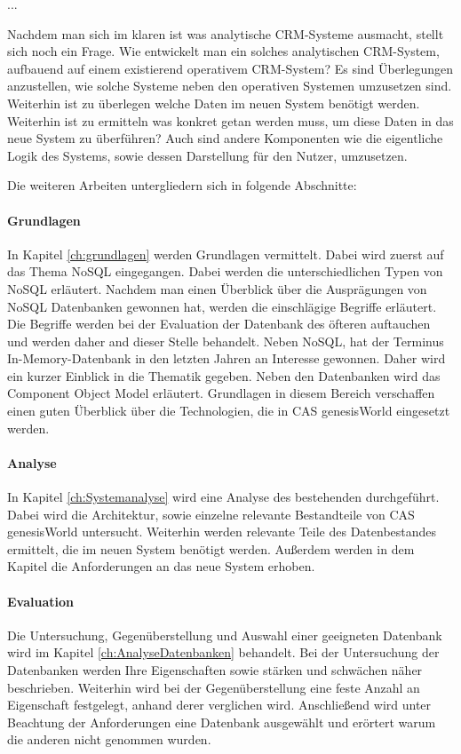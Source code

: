 ...

Nachdem man sich im klaren ist was analytische CRM-Systeme ausmacht, stellt sich noch ein Frage. Wie entwickelt man ein solches analytischen CRM-System, aufbauend auf einem existierend operativem CRM-System? Es sind Überlegungen anzustellen, wie solche Systeme neben den operativen Systemen umzusetzen sind. Weiterhin ist zu überlegen welche Daten im neuen System benötigt werden. Weiterhin ist zu ermitteln was konkret getan werden muss, um diese Daten in das neue System zu überführen? Auch sind andere Komponenten wie die eigentliche Logik des Systems, sowie dessen Darstellung für den Nutzer, umzusetzen. 

Die weiteren Arbeiten untergliedern sich in folgende Abschnitte: 
 
\paragraph{Grundlagen} In Kapitel \ref{ch:grundlagen} werden Grundlagen vermittelt. Dabei wird zuerst auf das Thema NoSQL eingegangen. Dabei werden die unterschiedlichen Typen von NoSQL erläutert. Nachdem man einen Überblick über die Ausprägungen von NoSQL Datenbanken gewonnen hat, werden die einschlägige Begriffe erläutert. Die Begriffe werden bei der Evaluation der Datenbank des öfteren auftauchen und werden daher and dieser Stelle behandelt. Neben NoSQL, hat der Terminus In-Memory-Datenbank in den letzten Jahren an Interesse gewonnen. Daher wird ein kurzer Einblick in die Thematik gegeben. Neben den Datenbanken wird das Component Object Model erläutert. Grundlagen in diesem Bereich verschaffen einen guten Überblick über die Technologien, die in CAS genesisWorld eingesetzt werden. 

\paragraph{Analyse} In Kapitel \ref{ch:Systemanalyse} wird eine Analyse des bestehenden durchgeführt. Dabei wird die Architektur, sowie einzelne relevante Bestandteile von CAS genesisWorld untersucht. Weiterhin werden relevante Teile des Datenbestandes ermittelt, die im neuen System benötigt werden. Außerdem werden in dem Kapitel die Anforderungen an das neue System erhoben.

\paragraph{Evaluation} Die Untersuchung, Gegenüberstellung und Auswahl einer geeigneten Datenbank wird im Kapitel \ref{ch:AnalyseDatenbanken} behandelt. Bei der Untersuchung der Datenbanken werden Ihre Eigenschaften sowie stärken und schwächen näher beschrieben. Weiterhin wird bei der Gegenüberstellung eine feste Anzahl an Eigenschaft festgelegt, anhand derer verglichen wird. Anschließend wird unter Beachtung der Anforderungen eine Datenbank ausgewählt und erörtert warum die anderen nicht genommen wurden.  

